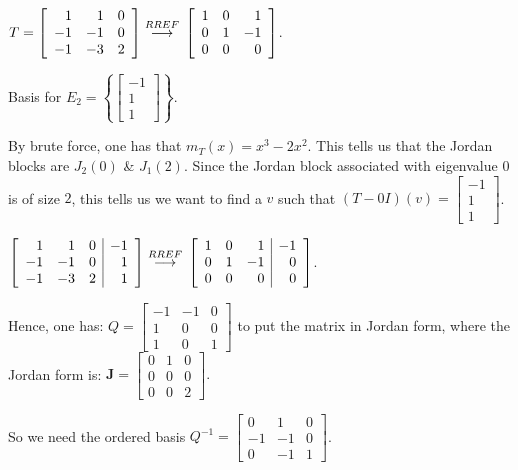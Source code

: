 \documentclass{article}
\newcommand{\matr}[1]{\mathbf{#1}}
\newcommand{\grstep}[2][\relax]{%
   \ensuremath{\mathrel{
       {\mathop{\longrightarrow}\limits^{#2\mathstrut}_{
                                     \begin{subarray}{l} #1 \end{subarray}}}}}}
\begin{document}
$T = \left[\begin{array}{rrr}
1 & 1 & 0 \\
-1 & -1 & 0 \\
-1 & -3 & 2
\end{array}\right] \grstep{RREF}{} \left[\begin{array}{rrr}
1 & 0 & 1 \\
0 & 1 & -1 \\
0 & 0 & 0
\end{array}\right]$.

Basis for $E_2 = \left\{\left[\begin{array}{r}
-1 \\
1 \\
1
\end{array}\right]\right\}$. 

By brute force, one has that $m_T(x)=x^3 - 2x^2$. This tells us that the Jordan blocks are $J_2(0)$ \& $J_1(2)$. Since the Jordan block associated with eigenvalue $0$ is of size $2$, this tells us we want to find a $v$ such that $(T-0I)(v) = \left[\begin{array}{r}
-1 \\
1 \\
1
\end{array}\right]$.

$\left[\begin{array}{rrr|r}
1 & 1 & 0 & -1 \\
-1 & -1 & 0 & 1 \\
-1 & -3 & 2 & 1
\end{array}\right] \grstep{RREF}{} \left[\begin{array}{rrr|r}
1 & 0 & 1 & -1 \\
0 & 1 & -1 & 0 \\
0 & 0 & 0 & 0
\end{array}\right]$.

Hence, one has: $Q= \left[\begin{array}{rrr}
-1 & -1 & 0 \\
1 & 0 & 0 \\
1 & 0 & 1
\end{array}\right]$ to put the matrix in Jordan form, where the Jordan form is:
$\matr J= \left[\begin{array}{rrr}
0 & 1 & 0 \\
0 & 0 & 0 \\
0 & 0 & 2
\end{array}\right].
$

So we need the ordered basis $Q^{-1} = \left[\begin{array}{rrr}
0 & 1 & 0 \\
-1 & -1 & 0 \\
0 & -1 & 1
\end{array}\right]$.
\end{document}
